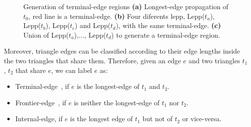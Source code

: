\documentclass[pdflatex,sn-mathphys]{sn-jnl}%
\theoremstyle{thmstyleone}%
\theoremstyle{thmstyletwo}%
\theoremstyle{thmstylethree}%
\begin{document}
\begin{figure}[h]
\centering     %
{} 
\caption{Generation of terminal-edge regions \textbf{(a)} Longest-edge propagation of $t_0$, red line is a terminal-edge. \textbf{(b)} Four diferents lepp, Lepp($t_a$), Lepp($t_b$), Lepp($t_c$) and Lepp($t_d$), with the same terminal-edge. \textbf{(c)} Union of Lepp($t_a$),..., Lepp($t_d$) to generate a terminal-edge region.}
\label{fig:leppexample} 
\end{figure}

\noindent
Moreover, triangle edges can be classified according to their edge lengths inside the two triangles that share them. Therefore, given an edge $e$ and two triangles $t_1$, $t_2$ that share $e$, we can label  $e$ as: 

\begin{itemize}
    \item Terminal-edge~\cite{Rivara97}, if $e$ is the longest-edge of $t_1$ and $t_2$.
    \item Frontier-edge~\cite{Ascom209}, if $e$ is neither the longest-edge of $t_1$ nor $t_2$.
    \item Internal-edge, if $e$ is the longest edge of $t_1$ but not of $t_2$ or vice-versa.
\end{itemize}
\end{document}
